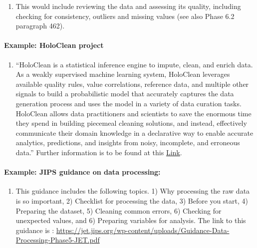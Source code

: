 \documentclass[
]{article}
\providecommand{\tightlist}{%
  \setlength{\itemsep}{0pt}\setlength{\parskip}{0pt}}
\begin{document}
\begin{enumerate}
\def\labelenumi{\arabic{enumi}.}
\setcounter{enumi}{381}
\tightlist
\item
  This would include reviewing the data and assessing its quality,
  including checking for consistency, outliers and missing values (see
  also Phase 6.2 paragraph 462).
\end{enumerate}

\hypertarget{example-holoclean-project}{%
\paragraph{Example: HoloClean project}\label{example-holoclean-project}}

\begin{enumerate}
\def\labelenumi{\arabic{enumi}.}
\setcounter{enumi}{382}
\tightlist
\item
  ``HoloClean is a statistical inference engine to impute, clean, and
  enrich data. As a weakly supervised machine learning system,
  HoloClean leverages available quality rules, value correlations,
  reference data, and multiple other signals to build a probabilistic
  model that accurately captures the data generation process and uses
  the model in a variety of data curation tasks. HoloClean allows data
  practitioners and scientists to save the enormous time they spend in
  building piecemeal cleaning solutions, and instead, effectively
  communicate their domain knowledge in a declarative way to enable
  accurate analytics, predictions, and insights from noisy,
  incomplete, and erroneous data.'' Further information is to be found
  at this \href{http://www.holoclean.io/}{Link}.
\end{enumerate}

\hypertarget{example-jips-guidance-on-data-processing}{%
\paragraph{\texorpdfstring{Example: JIPS guidance on data processing: {}}{Example: JIPS guidance on data processing: }}\label{example-jips-guidance-on-data-processing}}

\begin{enumerate}
\def\labelenumi{\arabic{enumi}.}
\setcounter{enumi}{383}
\tightlist
\item
  This guidance includes the following topics. 1) Why processing the
  raw data is so important, 2) Checklist for processing the data, 3)
  Before you start, 4) Preparing the dataset, 5) Cleaning common
  errors, 6) Checking for unexpected values, and 6) Preparing
  variables for analysis. The link to this guidance is : {}
  \url{https://jet.jips.org/wp-content/uploads/Guidance-Data-Processing-Phase5-JET.pdf}
\end{enumerate}
\end{document}
